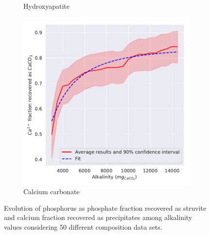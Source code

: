 \documentclass[10pt,a4paper]{article}
\begin{document}
\begin{figure}[H]
\begin{subfigure}[t]{0.32\textheight}
		\caption{Hydroxyapatite}
		\label{fig:estimation_Alk_HAP}
	\end{subfigure} 
	\begin{subfigure}[t]{0.32\textheight}
		\includegraphics[width=\textwidth]{x_plotCaCO3Yield_Alk}
		\caption{Calcium carbonate}
		\label{fig:estimation_Alk_CaCO3}
	\end{subfigure}

	\caption{Evolution of phosphorus as phosphate fraction recovered as struvite and calcium fraction recovered as precipitates among alkalinity values considering 50 different composition data sets.}
	\label{fig:estimation_Alk}
\end{figure}

\newpage



\end{document}
